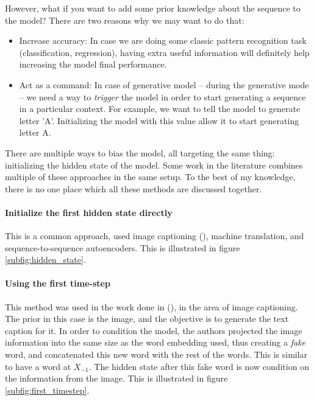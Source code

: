 \par However, what if you want to add some prior knowledge about the sequence to the model? There are two reasons why we may want to do that:
\begin{itemize}[noitemsep]
    \item Increase accuracy: In case we are doing some classic pattern recognition task (classification, regression), having extra useful information will definitely help increasing the model final performance.
    \item Act as a command: In case of generative model -- during the generative mode -- we need a way to \textit{trigger} the model in order to start generating a sequence in a particular context. For example, we want to tell the model to generate letter 'A'.  Initializing the model with this value allow it to start generating letter A.
\end{itemize}

There are multiple ways to bias the model, all targeting the same thing: initializing the hidden state of the model. Some work in the literature combines multiple of these approaches in the same setup. To the best of my knowledge, there is no one place which all these methods are discussed together.

\paragraph{Initialize the first hidden state directly} This is a common approach, used image captioning (\citep{karpathy2015deep}), machine translation, and sequence-to-sequence autoencoders. This is illustrated in figure \ref{subfig:hidden_state}.

\paragraph{Using the first time-step} This method was used in the work done in (\citep{vinyals2015show}), in the area of image captioning. The prior in this case is the image, and the objective is to generate the text caption for it. In order to condition the model, the authors projected the image information into the same size as the word embedding used, thus creating a \textit{fake} word, and concatenated this new word with the rest of the words. This is similar to have a word at $X_{-1}$. The hidden state after this fake word is now condition on the information from the image. This is illustrated in figure \ref{subfig:first_timestep}.

